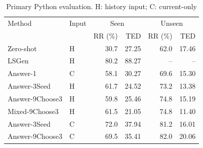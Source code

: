 \documentclass[10pt,conference]{IEEEtran}
\begin{document}
\begin{table}[h]
\caption{Primary Python evaluation. H: history input; C: current-only}
\label{tab:main}
\centering\small
\begin{tabular}{@{}ll||rr|rr@{}}
\toprule
Method & Input & \multicolumn{2}{c|}{Seen} & \multicolumn{2}{c}{Unseen} \\
 & & RR (\%) & TED & RR (\%) & TED \\
\midrule
Zero-shot & H & 30.7 & 27.25 & 62.0 & 17.46 \\
LSGen & H & 80.2 & 88.27 & -- & -- \\
Answer-1 & C & 58.1 & 30.27 & 69.6 & 15.30 \\
Answer-3Seed & H & 61.7 & 24.52 & 73.2 & 13.38 \\
Answer-9Choose3 & H & 59.8 & 25.46 & 74.8 & 15.19 \\
Mixed-9Choose3 & H & 61.5 & 21.05 & 74.8 & 11.40 \\
\midrule
Answer-3Seed & C & 72.0 & 37.94 & 81.2 & 16.01 \\
Answer-9Choose3 & C & 69.5 & 35.41 & 82.0 & 20.06 \\
\bottomrule
\end{tabular}
\end{table}
\end{document}
